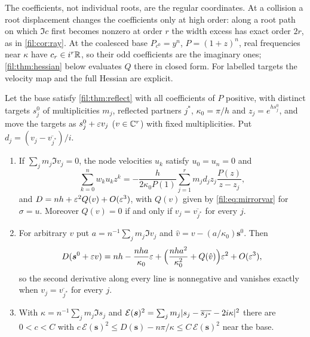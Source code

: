 The coefficients, not individual roots, are the regular coordinates. At a collision a root displacement
changes the coefficients only at high order: along a root path on which $\Im c$ first becomes nonzero at
order $r$ the width excess has exact order $2r$, as in \cref{fil:cor:ray}. At the coalesced base
$P_{c^0}=y^n$, $P=(1+z)^n$, real frequencies near $\kappa$ have $c_r\in i^r\mathbb{R}$, so their odd coefficients are the
imaginary ones; \cref{fil:thm:hessian} below evaluates $Q$ there in closed form. For labelled targets the
velocity map and the full Hessian are explicit.

\begin{corollary}\label{fil:cor:mirrorlabel}
Let the base satisfy \cref{fil:thm:reflect} with all coefficients of $P$ positive, with distinct targets $s_j^0$ of
multiplicities $m_j$, reflected partners $j^*$, $\kappa_0=\pi/h$ and $z_j=e^{hs_j^0}$, and move the targets as
$s_j^0+\varepsilon v_j$ ($v\in\mathbb{C}^r$) with fixed multiplicities. Put $d_j=(v_j-\overline{v_{j^*}})/i$.
\begin{enumerate}[label=\textup{(\roman*)}]
\item If $\sum_jm_j\Im v_j=0$, the node velocities $u_k$ satisfy $u_0=u_n=0$ and
\[
 \sum_{k=0}^nw_ku_kz^k=-\frac h{2\kappa_0P(1)}\sum_{j=1}^rm_jd_jz_j\frac{P(z)}{z-z_j},
\]
and $D=nh+\varepsilon^2Q(v)+O(\varepsilon^3)$, with $Q(v)$ given by \eqref{fil:eq:mirrorvar} for $\sigma=u$. Moreover $Q(v)=0$ if and
only if $v_j=\overline{v_{j^*}}$ for every $j$.
\item For arbitrary $v$ put $a=n^{-1}\sum_jm_j\Im v_j$ and $\hat v=v-(a/\kappa_0)\boldsymbol s^0$. Then
\[
 D(\boldsymbol s^0+\varepsilon v)=nh-\frac{nha}{\kappa_0}\varepsilon+\Bigl(\frac{nha^2}{\kappa_0^2}+Q(\hat v)\Bigr)\varepsilon^2+O(\varepsilon^3),
\]
so the second derivative along every line is nonnegative and vanishes exactly when $v_j=\overline{v_{j^*}}$ for
every $j$.
\item With $\kappa=n^{-1}\sum_jm_j\Im s_j$ and
$\mathcal E(\boldsymbol s)^2=\sum_jm_j\lvert s_j-\overline{s_{j^*}}-2i\kappa\rvert^2$ there are $0<c<C$ with
$c\,\mathcal E(\boldsymbol s)^2\le D(\boldsymbol s)-n\pi/\kappa\le C\,\mathcal E(\boldsymbol s)^2$ near the base.
\end{enumerate}
\end{corollary}

